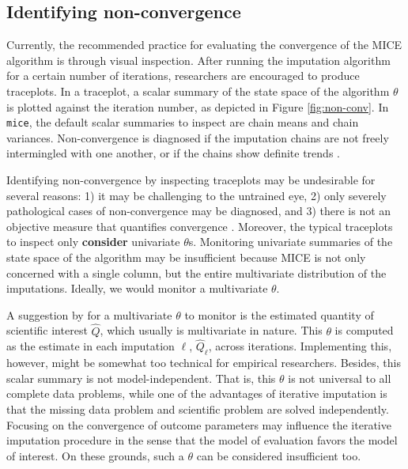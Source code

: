 \documentclass[Royal,times,sageh]{sagej}
\begin{document}
\hypertarget{identifying-non-convergence}{%
\subsection{Identifying non-convergence}\label{identifying-non-convergence}}

Currently, the recommended practice for evaluating the convergence of the MICE algorithm is through visual inspection. After running the imputation algorithm for a certain number of iterations, researchers are encouraged to produce traceplots. In a traceplot, a scalar summary of the state space of the algorithm \(\theta\) is plotted against the iteration number, as depicted in Figure \ref{fig:non-conv}. In \texttt{mice}, the default scalar summaries to inspect are chain means and chain variances. Non-convergence is diagnosed if the imputation chains are not freely intermingled with one another, or if the chains show definite trends \citep{buur18}.

Identifying non-convergence by inspecting traceplots may be undesirable for several reasons: 1) it may be challenging to the untrained eye, 2) only severely pathological cases of non-convergence may be diagnosed, and 3) there is not an objective measure that quantifies convergence \citep[\(\S\) 6.5.2]{buur18}. Moreover, the typical traceplots to inspect only \textbf{consider} univariate \(\theta\)s. Monitoring univariate summaries of the state space of the algorithm may be insufficient because MICE is not only concerned with a single column, but the entire multivariate distribution of the imputations. Ideally, we would monitor a multivariate \(\theta\).

A suggestion by \citet{buur18} for a multivariate \(\theta\) to monitor is the estimated quantity of scientific interest \(\hat{Q}\), which usually is multivariate in nature. This \(\theta\) is computed as the estimate in each imputation \(\ell\), \(\hat{Q}_\ell\), across iterations. Implementing this, however, might be somewhat too technical for empirical researchers. Besides, this scalar summary is not model-independent. That is, this \(\theta\) is not universal to all complete data problems, while one of the advantages of iterative imputation is that the missing data problem and scientific problem are solved independently. Focusing on the convergence of outcome parameters may influence the iterative imputation procedure in the sense that the model of evaluation favors the model of interest. On these grounds, such a \(\theta\) can be considered insufficient too.
\end{document}
